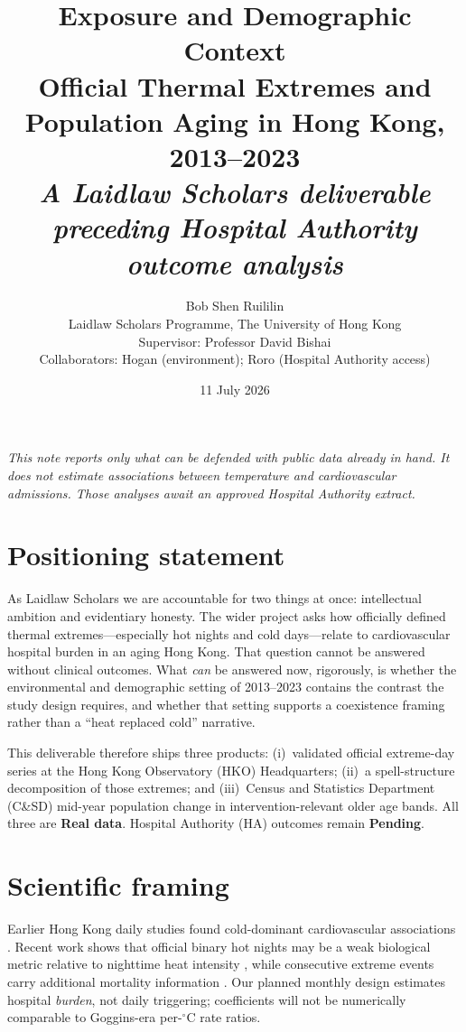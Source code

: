 \documentclass[11pt]{article}
\title{
  \textbf{Exposure and Demographic Context}\\[0.35em]
  \large Official Thermal Extremes and Population Aging in Hong Kong, 2013--2023\\[0.4em]
  \normalsize\textit{A Laidlaw Scholars deliverable preceding Hospital Authority outcome analysis}
}
\author{
  Bob Shen Ruililin\\
  Laidlaw Scholars Programme, The University of Hong Kong\\[0.35em]
  \small
  Supervisor: Professor David Bishai\\
  Collaborators: Hogan (environment); Roro (Hospital Authority access)
}
\date{11 July 2026}
\newcommand{\realdata}{\textcolor{green!35!black}{\textbf{Real data}}}
\newcommand{\pending}{\textcolor{red!60!black}{\textbf{Pending}}}
\begin{document}
\maketitle

\begin{center}
\small\textit{
This note reports only what can be defended with public data already in hand.
It does not estimate associations between temperature and cardiovascular admissions.
Those analyses await an approved Hospital Authority extract.
}
\end{center}

\section*{Positioning statement}

As Laidlaw Scholars we are accountable for two things at once: intellectual ambition and
evidentiary honesty. The wider project asks how officially defined thermal extremes---especially
hot nights and cold days---relate to cardiovascular hospital burden in an aging Hong Kong.
That question cannot be answered without clinical outcomes. What \emph{can} be answered now,
rigorously, is whether the environmental and demographic setting of 2013--2023 contains the
contrast the study design requires, and whether that setting supports a coexistence framing
rather than a ``heat replaced cold'' narrative.

This deliverable therefore ships three products: (i)~validated official extreme-day series at
the Hong Kong Observatory (HKO) Headquarters; (ii)~a spell-structure decomposition of those
extremes; and (iii)~Census and Statistics Department (C\&SD) mid-year population change in
intervention-relevant older age bands. All three are \realdata{}. Hospital Authority (HA)
outcomes remain \pending{}.

\section{Scientific framing}

Earlier Hong Kong daily studies found cold-dominant cardiovascular associations
\citep{goggins2013,goggins2012}. Recent work shows that official binary hot nights may be a
weak biological metric relative to nighttime heat intensity \citep{guo2024}, while consecutive
extreme events carry additional mortality information \citep{wang2019}. Our planned monthly
design estimates hospital \emph{burden}, not daily triggering; coefficients will not be
numerically comparable to Goggins-era per-$^\circ$C rate ratios.
\end{document}
